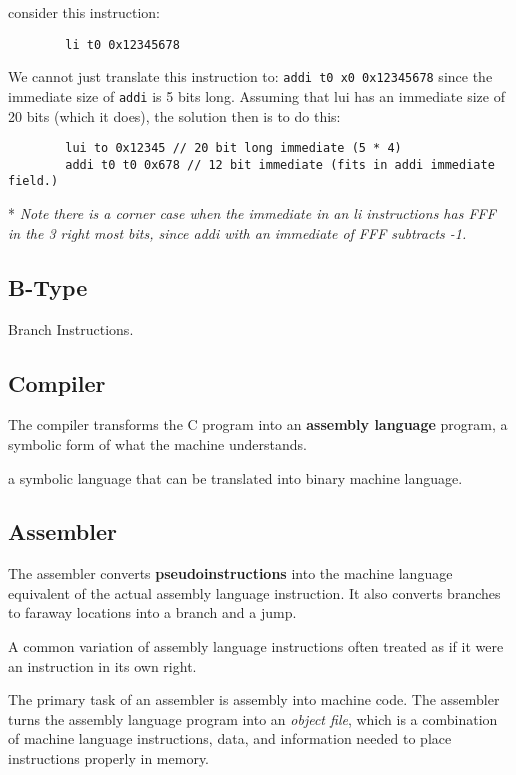 \documentclass[12pt]{article}
\begin{document}
\begin{example}
    consider this instruction:
    \begin{lstlisting}
        li t0 0x12345678
    \end{lstlisting}
    We cannot just translate this instruction to: \lstinline{addi t0 x0 0x12345678} since the immediate size of \lstinline{addi} is 5 bits long. Assuming that lui has an immediate size of 20 bits (which it does), the solution then is to do this:

    \begin{lstlisting}
        lui to 0x12345 // 20 bit long immediate (5 * 4)
        addi t0 t0 0x678 // 12 bit immediate (fits in addi immediate field.)
    \end{lstlisting}
    * \emph{Note there is a corner case when the immediate in an li instructions has FFF in the 3 right most bits, since addi with an immediate of FFF subtracts -1. }
\end{example}

\subsection*{B-Type}
Branch Instructions.




\subsection*{Compiler}
The compiler transforms the C program into an \textbf{assembly language} program, a symbolic form of what the machine understands.

\begin{definition}
    a symbolic language that can be translated into binary machine language.
\end{definition}

\subsection*{Assembler}
The assembler converts \textbf{pseudoinstructions} into the machine language equivalent of the actual assembly language instruction. It also converts branches to faraway locations into a branch and a jump.
\begin{definition}[Pseudoinstructions]
    A common variation of assembly language instructions often treated as if it were an instruction in its own right.
\end{definition}
The primary task of an assembler is assembly into machine code. The assembler turns the assembly language program into an \emph{object file}, which is a combination of machine language instructions, data, and information needed to place instructions properly in memory.
\end{document}
